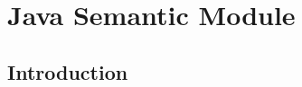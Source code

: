 \chapter{Java Semantic Module}

\section{Introduction}

\section{}
\label{java.class}

\section{}
\label{java.condition}

\section{}
\label{java.extractor}

\section{}
\label{java.consequence}

